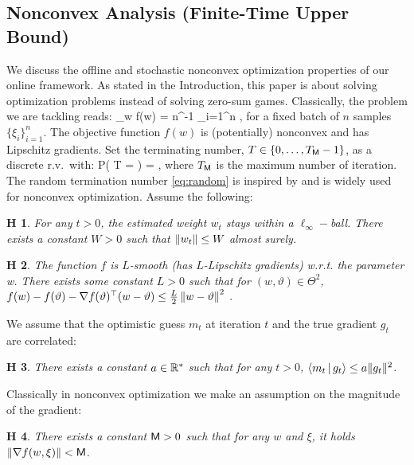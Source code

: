 \documentclass[11pt]{article}
\newtheorem{assumption}{H\!\!}
\theoremstyle{k}
\begin{document}
\subsection{Nonconvex Analysis (Finite-Time Upper Bound)}
We discuss the offline and stochastic nonconvex optimization properties of our online framework.
As stated in the Introduction, this paper is about solving optimization problems instead of solving zero-sum games.  
Classically, the problem we are tackling reads:
\beq\label{eq:minproblem}
\min \limits_{w \in \Theta} f(w) \eqdef  \EE[ f(w, \xi)] = n^{-1} \sum_{i=1}^n  \EE[f(w, \xi_i)] \eqsp,
\eeq
for a fixed batch of $n$ samples $\{ \xi_i \}_{i=1}^n$.
The objective function $f(w)$ is (potentially) nonconvex and has Lipschitz gradients.
Set the terminating number, $T \in \{0,\dots,T_{\sf M}-1\}$, as a discrete r.v.~with:
\beq \label{eq:random}
   P( T = \ell ) =  \eqsp,
\eeq
where $T_{\sf M}$ is the maximum number of iteration.
The random termination number \eqref{eq:random} is inspired by \citep{ghadimi2013stochastic} and is widely used for nonconvex optimization. 
Assume the following:
\begin{assumption}\label{ass:boundedparam}
For any $t >0$, the estimated weight $w_t$ stays within a $\ell_{\infty}-$ball. There exists a constant $W >0$ such that $\left\Vert w_t \right\Vert \leq W$ almost surely.
\end{assumption}
\begin{assumption}\label{ass:smooth}
The function $f$ is $L$-smooth (has $L$-Lipschitz gradients) w.r.t. the parameter w.
There exists some constant $L > 0$ such that for $(w, \vartheta) \in \Theta^2$, $f(w) - f(\vartheta) - \nabla f(\vartheta)^\top(w - \vartheta) \leq \frac{L}{2} \left\Vert w - \vartheta \right\Vert^2\;.$
\end{assumption}
We assume that the optimistic guess $m_t$ at iteration $t$ and the true gradient $g_t$ are correlated:
\begin{assumption}\label{ass:guessbound}
There exists a constant $a \in \mathbb{R}^* $ such that for any $t >0$, $ \left\langle m_t\,|\, g_t \right\rangle  \leq a \|g_t\|^2$.
\end{assumption}
Classically in nonconvex optimization \citep{ghadimi2013stochastic} we make an assumption on the magnitude of the gradient:
\begin{assumption}\label{ass:bounded}
There exists a constant $\mathsf{M} >0$ such that for any $w$ and $\xi$, it holds $\left\Vert \nabla f(w, \xi) \right\Vert < \mathsf{M}$.
\end{assumption}
\end{document}
